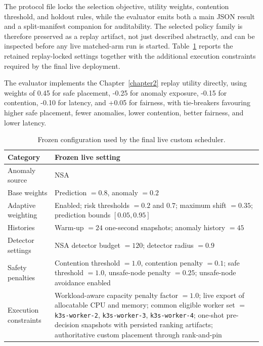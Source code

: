 The protocol file locks the selection objective, utility weights, contention threshold, and holdout rules, while the evaluator emits both a main JSON result and a split-manifest companion for auditability. The selected policy family is therefore preserved as a replay artifact, not just described abstractly, and can be inspected before any live matched-arm run is started. Table~\ref{tab:ch3-live-lock} reports the retained replay-locked settings together with the additional execution constraints required by the final live deployment.

The evaluator implements the Chapter~\ref{chapter2} replay utility directly, using weights of 0.45 for safe placement, -0.25 for anomaly exposure, -0.15 for contention, -0.10 for latency, and +0.05 for fairness, with tie-breakers favouring higher safe placement, fewer anomalies, lower contention, better fairness, and lower latency.

\begin{table}[h]
\centering
\small
\begin{tabular}{lp{9.2cm}}
\hline
\textbf{Category} & \textbf{Frozen live setting} \\
\hline
Anomaly source & NSA \\
Base weights & Prediction \(= 0.8\), anomaly \(= 0.2\) \\
Adaptive weighting & Enabled; risk thresholds \(= 0.2\) and \(0.7\); maximum shift \(= 0.35\); prediction bounds \([0.05, 0.95]\) \\
Histories & Warm-up \(= 24\) one-second snapshots; anomaly history \(= 45\) \\
Detector settings & NSA detector budget \(= 120\); detector radius \(= 0.9\) \\
Safety penalties & Contention threshold \(= 1.0\), contention penalty \(= 0.1\); safe threshold \(= 1.0\), unsafe-node penalty \(= 0.25\); unsafe-node avoidance enabled \\
Execution constraints & Workload-aware capacity penalty factor \(= 1.0\); live export of allocatable CPU and memory; common eligible worker set \(=\) \texttt{k3s-worker-2}, \texttt{k3s-worker-3}, \texttt{k3s-worker-4}; one-shot pre-decision snapshots with persisted ranking artifacts; authoritative custom placement through rank-and-pin \\
\hline
\end{tabular}
\caption{Frozen configuration used by the final live custom scheduler.}
\label{tab:ch3-live-lock}
\end{table}

